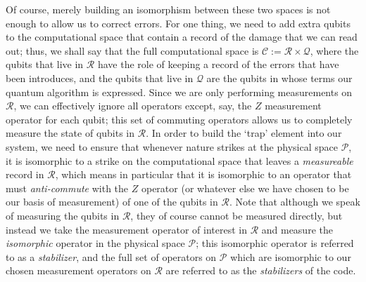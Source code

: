\documentclass[twocolumn,showpacs,preprintnumbers,amsmath,amssymb,nofootinbib,pra,floatfix]{revtex4}
\begin{document}
Of course, merely building an isomorphism between these two spaces is not enough to allow us to correct errors.  For one thing, we need to add extra qubits to the computational space that contain a record of the damage that we can read out;  thus, we shall say that the full computational space is $\mathscr{C}:=\mathscr{R}\times\mathscr{Q}$, where the qubits that live in $\mathscr{R}$ have the role of keeping a record of the errors that have been introduces, and the qubits that live in $\mathscr{Q}$ are the qubits in whose terms our quantum algorithm is expressed.  Since we are only performing measurements on $\mathscr{R}$, we can effectively ignore all operators except, say, the $Z$ measurement operator for each qubit;  this set of commuting operators allows us to completely measure the state of qubits in $\mathscr{R}$.  In order to build the `trap' element into our system, we need to ensure that whenever nature strikes at the physical space $\mathscr{P}$, it is isomorphic to a strike on the computational space that leaves a \emph{measureable} record in $\mathscr{R}$, which means in particular that it is isomorphic to an operator that must \emph{anti-commute} with the $Z$ operator (or whatever else we have chosen to be our basis of measurement) of one of the qubits in $\mathscr{R}$.  Note that although we speak of measuring the qubits in $\mathscr{R}$, they of course cannot be measured directly, but instead we take the measurement operator of interest in $\mathscr{R}$ and measure the \emph{isomorphic} operator in the physical space $\mathscr{P}$;  this isomorphic operator is referred to as a \emph{stabilizer}, and the full set of operators on $\mathscr{P}$ which are isomorphic to our chosen measurement operators on $\mathscr{R}$ are referred to as the \emph{stabilizers} of the code.
\end{document}
